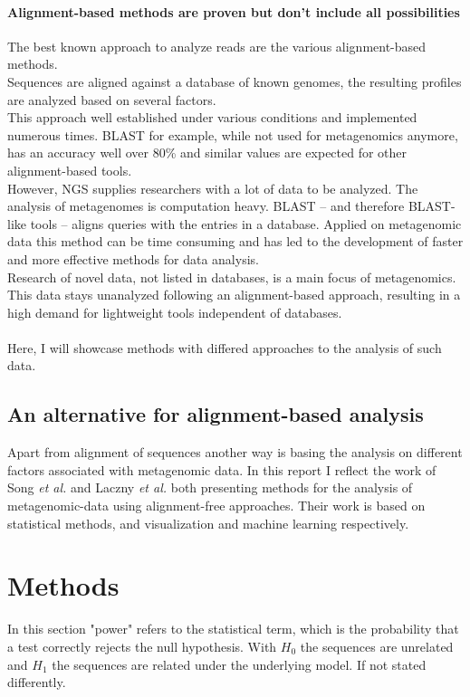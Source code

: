 \documentclass[twocolumn]{bmcart}%
\begin{document}
\paragraph*{Alignment-based methods are proven but don't include all possibilities}
The best known approach to analyze reads are the various alignment-based methods.\\
Sequences are aligned against a database of known genomes, the resulting profiles are analyzed based on several factors.\\
This approach well established under various conditions and implemented numerous times. BLAST for example, while not used for metagenomics anymore, has an accuracy well over 80\%\cite{doi:10.1142/9789814295291_0003} and similar values are expected for other alignment-based tools.\\
However, NGS supplies researchers with a lot of data to be analyzed. The analysis of metagenomes is computation heavy. BLAST -- and therefore BLAST-like tools -- aligns queries with the entries in a database. Applied on metagenomic data this method can be time consuming and has led to the development of faster and more effective methods for data analysis.\\
Research of  novel data, not listed in databases, is a main focus of metagenomics. This data stays unanalyzed following an alignment-based approach, resulting in a high demand for lightweight tools independent of databases.
\paragraph*{}
Here, I will showcase methods with differed approaches to the analysis of such data. 
\subsection*{An alternative for alignment-based analysis}
Apart from alignment of sequences another way is basing the analysis on different factors associated with metagenomic data. In this report I reflect the work of Song \textit{et al.} \cite{doi:10.1093/bib/bbt067} and Laczny \textit{et al.} \cite{Laczny2014} both presenting methods for the analysis of metagenomic-data using alignment-free approaches. Their work is based on statistical methods, and visualization and machine learning respectively.
\section*{Methods}
In this section "power" refers to the statistical term, which is the probability that a test correctly rejects the null hypothesis. With $H_0$ the sequences are unrelated and $H_1$ the sequences are related under the underlying model. If not stated differently.
\end{document}
